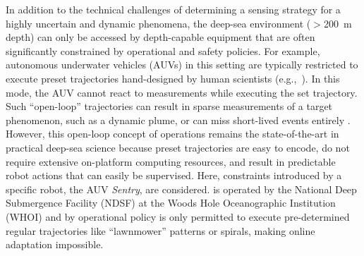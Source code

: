 In addition to the technical challenges of determining a sensing strategy for a highly uncertain and dynamic phenomena, the deep-sea environment ($>$\SI{200}{\meter} depth) can only be accessed by depth-capable equipment that are often significantly constrained by operational and safety policies. For example, autonomous underwater vehicles (AUVs) in this setting are typically restricted to execute preset trajectories hand-designed by human scientists (e.g.,~\cite{camilli2010tracking}). In this mode, the AUV cannot react to measurements while executing the set trajectory. Such ``open-loop'' trajectories can result in sparse measurements of a target phenomenon, such as a dynamic plume, or can miss short-lived events entirely \autocite{flaspohler2019information, preston2019adaptive}. However, this open-loop concept of operations remains the state-of-the-art in practical deep-sea science because preset trajectories are easy to encode, do not require extensive on-platform computing resources, and result in predictable robot actions that can easily be supervised. Here, constraints introduced by a specific robot, the AUV \emph{Sentry}, are considered. \Sentry is operated by the National Deep Submergence Facility (NDSF) at the Woods Hole Oceanographic Institution (WHOI) \autocite{kaiser2016design} and by operational policy is only permitted to execute pre-determined regular trajectories like ``lawnmower'' patterns or spirals, making online adaptation impossible. %

